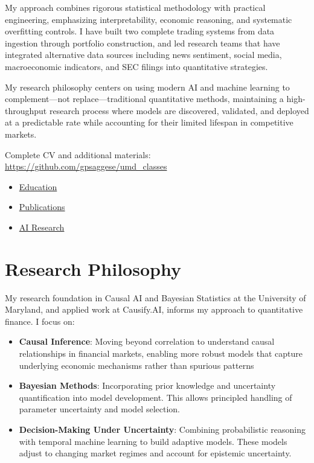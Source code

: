 \documentclass[11pt, letterpaper]{article}
\begin{document}
  My approach combines rigorous statistical methodology with practical engineering,
  emphasizing interpretability, economic reasoning, and systematic
  overfitting controls. I have built two complete trading systems from data
  ingestion through portfolio construction, and led research teams that
  have integrated alternative data sources including news sentiment, social
  media, macroeconomic indicators, and SEC filings into quantitative strategies.

  My research philosophy centers on using modern AI and machine learning
  to complement---not replace---traditional quantitative methods,
  maintaining a high-throughput research process where models are
  discovered, validated, and deployed at a predictable rate while
  accounting for their limited lifespan in competitive markets.

  Complete CV and additional materials: \href{https://github.com/gpsaggese/umd_classes}{https://github.com/gpsaggese/umd\_classes}

  \begin{itemize}
    \item \href{https://gpsaggese.github.io/umd_classes/03_education/}{Education}

    \item \href{https://gpsaggese.github.io/umd_classes/05_publications/}{Publications}

    \item \href{https://gpsaggese.github.io/umd_classes/06_research/}{AI
      Research}
  \end{itemize}

  \section{Research Philosophy}
  \label{research-philosophy}

  My research foundation in Causal AI and Bayesian Statistics at the
  University of Maryland, and applied work at Causify.AI, informs my
  approach to quantitative finance. I focus on:

  \begin{itemize}
    \item \textbf{Causal Inference}: Moving beyond correlation to understand
      causal relationships in financial markets, enabling more robust
      models that capture underlying economic mechanisms rather than
      spurious patterns

    \item \textbf{Bayesian Methods}: Incorporating prior knowledge and uncertainty
      quantification into model development. This allows principled
      handling of parameter uncertainty and model selection.

    \item \textbf{Decision-Making Under Uncertainty}: Combining probabilistic
      reasoning with temporal machine learning to build adaptive models.
      These models adjust to changing market regimes and account for
      epistemic uncertainty.
  \end{itemize}
\end{document}
